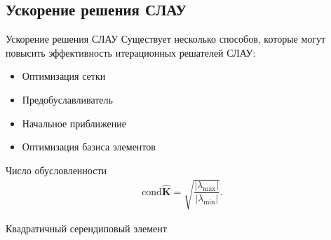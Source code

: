 \subsection{Ускорение решения СЛАУ}
\begin{frame}{Ускорение решения СЛАУ}
	Существует несколько способов, которые могут повысить эффективность итерационных решателей СЛАУ:
	
	\begin{minipage}{0.49\textwidth}
		\begin{itemize}
			\item Оптимизация сетки
			\item Предобуславливатель
			\item Начальное приближение
			\item Оптимизация базиса элементов
		\end{itemize}
		
		Число обусловленности
		\begin{gather*}
			\text{cond} \widehat{\textbf{K}} = \sqrt{\dfrac{|\lambda_{\max}|}{|\lambda_{\min}|}}.
		\end{gather*}
	\end{minipage}
	\hfill
	\begin{minipage}{0.5\textwidth}
		Квадратичный серендиповый элемент
	\end{minipage}
\end{frame}


